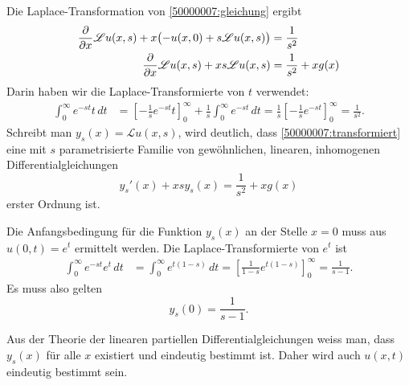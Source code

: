 \begin{loesung}
\begin{teilaufgaben}
\item
Die Laplace-Transformation von \eqref{50000007:gleichung} ergibt
\begin{align}
\frac{\partial}{\partial x}\mathscr{L}u(x,s)
+x\bigl(-u(x,0)+s\mathscr{L}u(x,s)\bigr)&=\frac1{s^2}
\notag
\\
\frac{\partial}{\partial x}\mathscr{L}u(x,s)
+xs\mathscr{L}u(x,s)&=\frac1{s^2}+xg(x)
\label{50000007:transformiert}
\end{align}
Darin haben wir die Laplace-Transformierte von $t$ verwendet:
\begin{align*}
\int_0^\infty e^{-st}t\,dt
&=
\left[
-\frac1{s} e^{-st}t
\right]_0^\infty
+\frac1s\int_0^\infty e^{-st}\,dt
=\frac1s\left[
-\frac1se^{-st}
\right]_0^\infty=\frac1{s^2}.
\end{align*}
Schreibt man $y_s(x)=\mathscr{L}u(x,s)$, wird deutlich,
dass \eqref{50000007:transformiert} eine mit $s$ parametrisierte
Familie von gewöhnlichen, linearen, inhomogenen Differentialgleichungen
\begin{equation}
y_s'(x)+xsy_s(x)=\frac1{s^2}+xg(x)
\label{50000007:family}
\end{equation}
erster Ordnung ist.

Die Anfangsbedingung für die Funktion $y_s(x)$ an der Stelle $x=0$
muss aus $u(0,t)=e^t$ ermittelt werden.
Die Laplace-Transformierte von $e^t$ ist
\begin{align*}
\int_0^\infty e^{-st}e^t\,dt
&=
\int_0^\infty e^{t(1-s)}\,dt
=\left[\frac1{1-s}e^{t(1-s)}\right]_0^\infty=\frac1{s-1}.
\end{align*}
Es muss also gelten
\[
y_s(0)=\frac1{s-1}.
\]
\item
Aus der Theorie der linearen partiellen Differentialgleichungen weiss man,
dass $y_s(x)$ für alle $x$ existiert und eindeutig bestimmt ist. 
Daher wird auch $u(x,t)$ eindeutig bestimmt sein.


\end{teilaufgaben}
\end{loesung}

